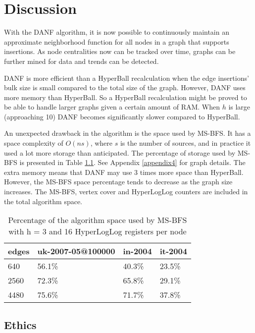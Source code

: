 \chapter{Discussion}
With the DANF algorithm, it is now possible to continuously maintain an approximate neighborhood function for all nodes in a graph that supports insertions. As node centralities now can be tracked over time, graphs can be further mined for data and trends can be detected. 

DANF is more efficient than a HyperBall recalculation when the edge insertions' bulk size is small compared to the total size of the graph. However, DANF uses more memory than HyperBall. So a HyperBall recalculation might be proved to be able to handle larger graphs given a certain amount of RAM. When $h$ is large (approaching 10) DANF becomes significantly slower compared to HyperBall.

An unexpected drawback in the algorithm is the space used by MS-BFS. It has a space complexity of $O(ns)$, where $s$ is the number of sources, and in practice it used a lot more storage than anticipated. The percentage of storage used by MS-BFS is presented in Table \ref{table:ms-bfs_space}. See Appendix \ref{appendix4} for graph details. The extra memory means that DANF may use 3 times more space than HyperBall. However, the MS-BFS space percentage tends to decrease as the graph size increases. The MS-BFS, vertex cover and HyperLogLog counters are included in the total algorithm space.

\begin{table}[h]
    \center
    \begin{tabular}{ | l | l | l | l |}
        \hline
        edges & uk-2007-05@100000 & in-2004 & it-2004 \\ \hline
        640  & 56.1\% & 40.3\% & 23.5\% \\ \hline
        2560 & 72.3\% & 65.8\% & 29.1\% \\ \hline 
        4480 & 75.6\% & 71.7\% & 37.8\% \\
        \hline
    \end{tabular}
    \captionsetup{justification=centering}
    \caption{Percentage of the algorithm space used by MS-BFS with h = 3 and 16 HyperLogLog registers per node}
    \label{table:ms-bfs_space}
\end{table}

\section{Ethics}

